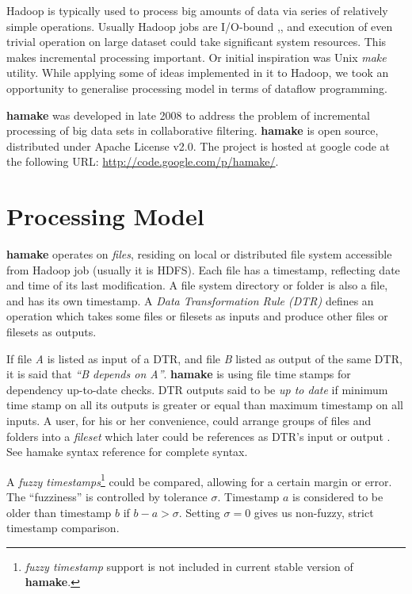 \documentclass[10pt,conference,letterpaper]{IEEEtran}
\begin{document}
Hadoop is typically used to process big amounts of data via series of
relatively simple operations. Usually Hadoop jobs are I/O-bound
\cite{hadoopattwitter},\cite{hs2010hadoopbench}, and execution of even
trivial operation on large dataset could take significant system
resources. This makes incremental processing important. Or initial
inspiration was Unix \emph{make} utility. While applying some of ideas
implemented in it to Hadoop, we took an opportunity to generalise
processing model in terms of dataflow programming.

\textbf{hamake} was developed in late 2008 to address the problem of
incremental processing of big data sets in collaborative filtering.
\textbf{hamake} is open source, distributed under Apache License
v2.0. The project is hosted at google code at the following URL:
\url{http://code.google.com/p/hamake/}.

\section{Processing Model}

\textbf{hamake} operates on \textit{files}, residing on local or
distributed file system accessible from Hadoop job (usually it is
HDFS). Each file has a timestamp, reflecting date and time of its last
modification. A file system directory or folder is also a file, and
has its own timestamp. A \textit{Data Transformation Rule (DTR)}
defines an operation which takes some files or filesets as inputs and
produce other files or filesets as outputs.

If file \textit{A} is listed as input of a DTR, and file \textit{B}
listed as output of the same DTR, it is said that \textit{``B depends
  on A''}. \textbf{hamake} is using file time stamps for dependency
up-to-date checks. DTR outputs said to be \textit{up to date} if
minimum time stamp on all its outputs is greater or equal than maximum
timestamp on all inputs. A user, for his or her convenience, could
arrange groups of files and folders into a \emph{fileset} which later
could be references as DTR's input or output . See hamake syntax
reference\cite{hamakesyntax} for complete syntax.

A \textit{fuzzy timestamps}\footnote{\textit{fuzzy timestamp} support
  is not included in current stable version of \textbf{hamake}.}
could be compared, allowing for a certain margin or error. The
``fuzziness'' is controlled by tolerance $\sigma$. Timestamp $a$ is
considered to be older than timestamp $b$ if $b-a>\sigma$. Setting
$\sigma=0$ gives us non-fuzzy, strict timestamp comparison.
\end{document}
